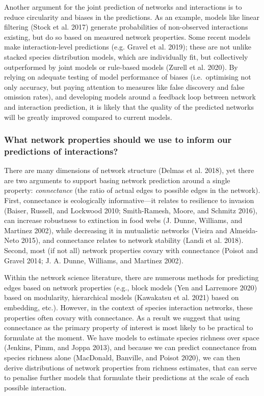 \documentclass[10pt,oneside]{article}
\begin{document}
Another argument for the joint prediction of networks and interactions
is to reduce circularity and biases in the predictions. As an example,
models like linear filtering (Stock et al. 2017) generate probabilities
of non-observed interactions existing, but do so based on measured
network properties. Some recent models make interaction-level
predictions (e.g. Gravel et al. 2019); these are not unlike stacked
species distribution models, which are individually fit, but
collectively outperformed by joint models or rule-based models (Zurell
et al. 2020). By relying on adequate testing of model performance of
biases (i.e.~optimising not only accuracy, but paying attention to
measures like false discovery and false omission rates), and developing
models around a feedback loop between network and interaction
prediction, it is likely that the quality of the predicted networks will
be greatly improved compared to current models.

\hypertarget{what-network-properties-should-we-use-to-inform-our-predictions-of-interactions}{%
\subsubsection{What network properties should we use to inform our
predictions of
interactions?}\label{what-network-properties-should-we-use-to-inform-our-predictions-of-interactions}}

There are many dimensions of network structure (Delmas et al. 2018), yet
there are two arguments to support basing network prediction around a
single property: \emph{connectance} (the ratio of actual edges to
possible edges in the network). First, connectance is ecologically
informative---it relates to resilience to invasion (Baiser, Russell, and
Lockwood 2010; Smith-Ramesh, Moore, and Schmitz 2016), can increase
robustness to extinction in food webs (J. Dunne, Williams, and Martinez
2002), while decreasing it in mutualistic networks (Vieira and
Almeida-Neto 2015), and connectance relates to network stability (Landi
et al. 2018). Second, most (if not all) network properties covary with
connectance (Poisot and Gravel 2014; J. A. Dunne, Williams, and Martinez
2002).

Within the network science literature, there are numerous methods for
predicting edges based on network properties (e.g., block models (Yen
and Larremore 2020) based on modularity, hierarchical models (Kawakatsu
et al. 2021) based on embedding, etc.). However, in the context of
species interaction networks, these properties often covary with
connectance. As a result we suggest that using connectance as the
primary property of interest is most likely to be practical to formulate
at the moment. We have models to estimate species richness over space
(Jenkins, Pimm, and Joppa 2013), and because we can predict connectance
from species richness alone (MacDonald, Banville, and Poisot 2020), we
can then derive distributions of network properties from richness
estimates, that can serve to penalise further models that formulate
their predictions at the scale of each possible interaction.
\end{document}
